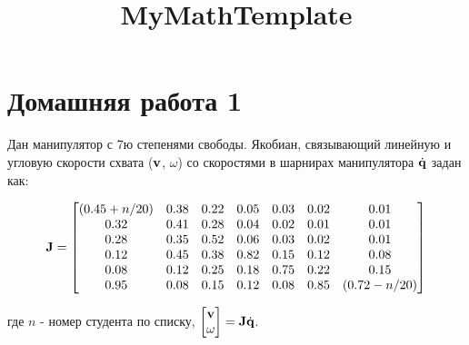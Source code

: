 \documentclass[8pt]{article}
\title{MyMathTemplate}
\begin{document}
\section*{Домашняя работа 1 }

Дан манипулятор с 7ю степенями свободы. Якобиан, связывающий линейную и угловую скорости схвата ($\mathbf{v}$, $\omega$) со скоростями в шарнирах манипулятора $\dot{\mathbf{q}}$ задан как:

\begin{equation}
    \mathbf{J} = 
    \begin{bmatrix}
    (0.45+n/20)&  0.38&  0.22&  0.05&  0.03&  0.02&  0.01 \\
    0.32&  0.41&  0.28&  0.04&  0.02&  0.01&  0.01 \\
    0.28&  0.35&  0.52&  0.06&  0.03&  0.02&  0.01 \\
    0.12&  0.45&  0.38&  0.82&  0.15&  0.12&  0.08 \\
    0.08&  0.12&  0.25&  0.18&  0.75&  0.22&  0.15 \\
    0.95&  0.08&  0.15&  0.12&  0.08&  0.85&  (0.72-n/20)
    \end{bmatrix}
\end{equation}

где $n$ - номер студента по списку, $\begin{bmatrix}\mathbf{v} \\ \omega\end{bmatrix} =
\mathbf{J}\dot{\mathbf{q}}$.
\end{document}
